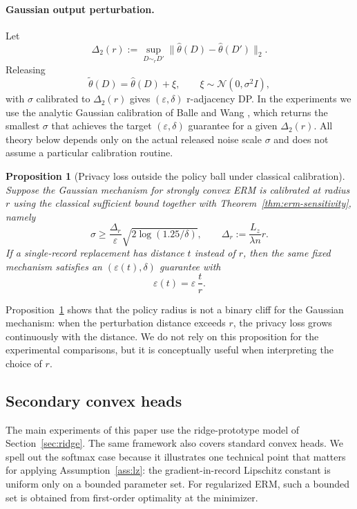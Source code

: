 \documentclass[conference,compsoc]{IEEEtran}
\newtheorem{proposition}{Proposition}
\begin{document}
\paragraph{Gaussian output perturbation.}
Let
\[
\Delta_2(r):=\sup_{D\sim_r D'} \|\hat\theta(D)-\hat\theta(D')\|_2.
\]
Releasing
\[
\widetilde\theta(D)=\hat\theta(D)+\xi,
\qquad
\xi\sim\mathcal{N}(0,\sigma^2 I),
\]
with $\sigma$ calibrated to $\Delta_2(r)$ gives $(\varepsilon,\delta)$ r-adjacency DP. In the experiments we use the analytic Gaussian calibration of Balle and Wang \cite{balle2018analytic}, which returns the smallest $\sigma$ that achieves the target $(\varepsilon,\delta)$ guarantee for a given $\Delta_2(r)$. All theory below depends only on the actual released noise scale $\sigma$ and does not assume a particular calibration routine.

\begin{proposition}[Privacy loss outside the policy ball under classical calibration]
\label{prop:outside-ball}
Suppose the Gaussian mechanism for strongly convex ERM is calibrated at radius $r$ using the classical sufficient bound together with Theorem~\ref{thm:erm-sensitivity}, namely
\[
\sigma\ge \frac{\Delta_r}{\varepsilon}\sqrt{2\log(1.25/\delta)},
\qquad
\Delta_r:=\frac{L_z}{\lambda n}r.
\]
If a single-record replacement has distance $t$ instead of $r$, then the same fixed mechanism satisfies an $(\varepsilon(t),\delta)$ guarantee with
\[
\varepsilon(t)=\varepsilon\,\frac{t}{r}.
\]
\end{proposition}

Proposition~\ref{prop:outside-ball} shows that the policy radius is not a binary cliff for the Gaussian mechanism: when the perturbation distance exceeds $r$, the privacy loss grows continuously with the distance. We do not rely on this proposition for the experimental comparisons, but it is conceptually useful when interpreting the choice of $r$.

\subsection{Secondary convex heads}
\label{sec:secondary-heads}

The main experiments of this paper use the ridge-prototype model of Section~\ref{sec:ridge}. The same framework also covers standard convex heads. We spell out the softmax case because it illustrates one technical point that matters for applying Assumption~\ref{ass:lz}: the gradient-in-record Lipschitz constant is uniform only on a bounded parameter set. For regularized ERM, such a bounded set is obtained from first-order optimality at the minimizer.
\end{document}
